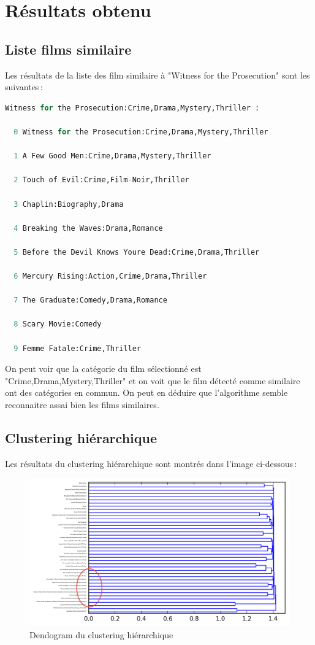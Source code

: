 \chapter{Résultats obtenu}
\section{Liste films similaire}

Les résultats de la liste des film similaire à "Witness for the Prosecution" sont les suivantes :

\begin{lstlisting}[language=python]
  Witness for the Prosecution:Crime,Drama,Mystery,Thriller :

  0 Witness for the Prosecution:Crime,Drama,Mystery,Thriller

  1 A Few Good Men:Crime,Drama,Mystery,Thriller

  2 Touch of Evil:Crime,Film-Noir,Thriller

  3 Chaplin:Biography,Drama

  4 Breaking the Waves:Drama,Romance

  5 Before the Devil Knows Youre Dead:Crime,Drama,Thriller

  6 Mercury Rising:Action,Crime,Drama,Thriller

  7 The Graduate:Comedy,Drama,Romance

  8 Scary Movie:Comedy

  9 Femme Fatale:Crime,Thriller
\end{lstlisting}

On peut voir que la catégorie du film sélectionné est "Crime,Drama,Mystery,Thriller" et on voit que le film détecté comme similaire ont des catégories en commun. On peut en déduire que l'algorithme semble reconnaitre assai bien les films similaires.

\newpage
\section{Clustering hiérarchique}

	Les résultats du clustering hiérarchique sont montrés dans l'image ci-dessous :
	\begin{figure}[h]
	  \centering
	    \includegraphics[width=0.6\linewidth]{img/clustering50_tf_idf.png}
	  \caption{Dendogram du clustering hiérarchique}
	  \label{hierarchical}
	\end{figure}
	
